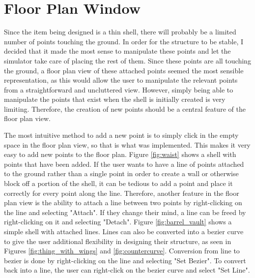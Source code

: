 \documentclass{thesis}
\begin{document}
\section{Floor Plan Window}
Since the item being designed is a thin shell, there will probably be a limited number of points touching the ground.  In order
for the structure to be stable, I decided that it made the most sense to manipulate these points and let the simulator take care
of placing the rest of them.  Since these points are all touching the ground, a floor plan view of these attached points seemed the
most sensible representation, as this would allow the user to manipulate the relevant points from a straightforward and uncluttered view.
However, simply being able to manipulate the points that exist when the shell is initially created is very limiting.  Therefore,
the creation of new points should be a central feature of the floor plan view.

The most intuitive method to add a new point is to simply click in the empty space in the floor plan view, so that is what was
implemented.  This makes it very easy to add new points to the floor plan.  Figure \ref{fig:waist} shows a shell with points that
have been added.  If the user wants to have a line of points attached to the ground rather than a single point in order to create
a wall or otherwise block off a portion of the shell, it can be tedious to add a point and place it correctly for every point along
the line.  Therefore, another feature in the floor plan view is the ability to attach a line between two points by right-clicking on
the line and selecting "Attach".  If they change their mind, a line can be freed by right-clicking on it and selecting "Detach".
Figure \ref{fig:barrel_vault} shows a simple shell with attached lines.  Lines can also be converted into a bezier curve to give
the user additional flexibility in designing their structure, as seen in Figures \ref{fig:thing_with_wings} and
\ref{fig:countercurve}.  Conversion from line to bezier is done by right-clicking on the line and selecting "Set Bezier".  To
convert back into a line, the user can right-click on the bezier curve and select "Set Line".
\end{document}
